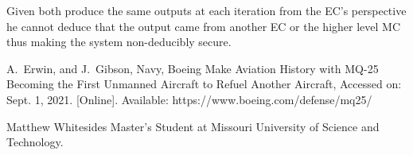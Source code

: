 \documentclass[10pt,journal,compsoc]{IEEEtran}
\begin{document}
Given both produce the same outputs at each iteration from the EC's perspective he cannot deduce that the output came from another EC or the higher level MC thus making the system non-deducibly secure.



\ifCLASSOPTIONcaptionsoff
  \newpage
\fi

\begin{thebibliography}{1}

A.~Erwin, and J.~Gibson, Navy, Boeing Make Aviation History with MQ-25 Becoming the First Unmanned Aircraft to Refuel Another Aircraft, Accessed on: Sept. 1, 2021. [Online]. Available: https://www.boeing.com/defense/mq25/ 

\end{thebibliography}

\begin{IEEEbiographynophoto}{Matthew Whitesides}
  Master's Student at Missouri University of Science and Technology.
\end{IEEEbiographynophoto}

\end{document}
